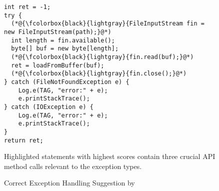 \begin{figure}[t]
	\centering
\begin{lstlisting}[]
int ret = -1;
try {
  (*@{\fcolorbox{black}{lightgray}{FileInputStream fin = new FileInputStream(path);}@*)
  int length = fin.available();
  byte[] buf = new byte[length];
  (*@{\fcolorbox{black}{lightgray}{fin.read(buf);}@*)
  ret = loadFromBuffer(buf);
  (*@{\fcolorbox{black}{lightgray}{fin.close();}@*)
} catch (FileNotFoundException e) {
    Log.e(TAG, "error:" + e);
    e.printStackTrace();
} catch (IOException e) {
    Log.e(TAG, "error:" + e);
    e.printStackTrace();
}
return ret;
\end{lstlisting}
\vspace{-9pt}
Highlighted statements with highest scores contain three crucial API method
calls relevant to the exception types.
\vspace{-9pt}
        \caption{Correct Exception Handling Suggestion by {\tool}}
        \label{fig:example-experiment}
\end{figure}

